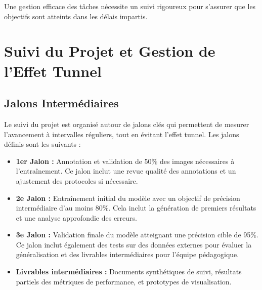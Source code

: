 Une gestion efficace des tâches nécessite un suivi rigoureux pour s'assurer que les objectifs sont atteints dans les délais impartis.
\section{Suivi du Projet et Gestion de l'Effet Tunnel}

\subsection{Jalons Intermédiaires}
Le suivi du projet est organisé autour de jalons clés qui permettent de mesurer l’avancement à intervalles réguliers, tout en évitant l’effet tunnel. Les jalons définis sont les suivants :
\begin{itemize}
    \item \textbf{1er Jalon :} Annotation et validation de 50\% des images nécessaires à l’entraînement. Ce jalon inclut une revue qualité des annotations et un ajustement des protocoles si nécessaire.
    \item \textbf{2e Jalon :} Entraînement initial du modèle avec un objectif de précision intermédiaire d’au moins 80\%. Cela inclut la génération de premiers résultats et une analyse approfondie des erreurs.
    \item \textbf{3e Jalon :} Validation finale du modèle atteignant une précision cible de 95\%. Ce jalon inclut également des tests sur des données externes pour évaluer la généralisation et des livrables intermédiaires pour l’équipe pédagogique.
    \item \textbf{Livrables intermédiaires :} Documents synthétiques de suivi, résultats partiels des métriques de performance, et prototypes de visualisation.
\end{itemize}


